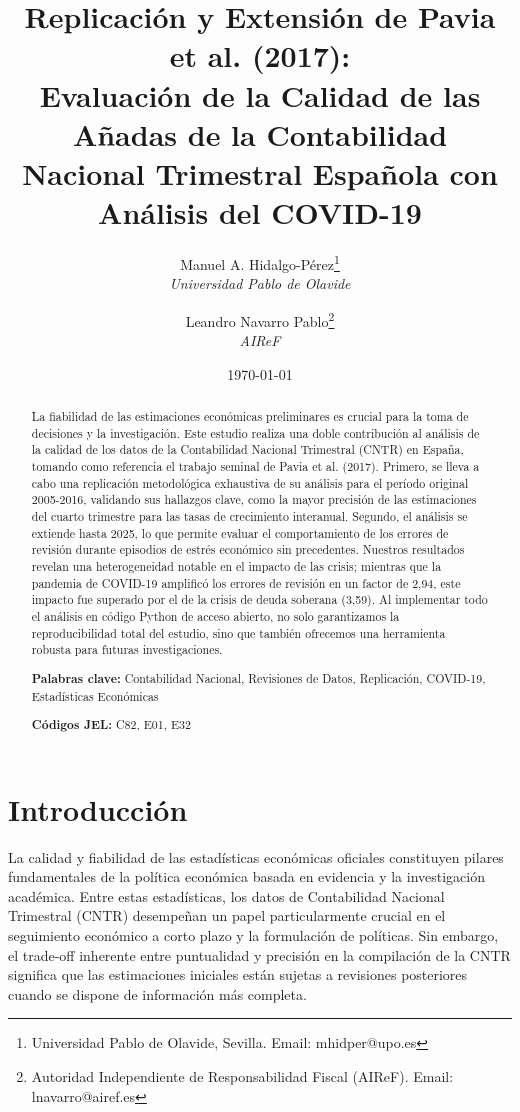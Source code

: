\documentclass[12pt,a4paper]{article}
\title{\textbf{Replicación y Extensión de Pavia et al. (2017): \\Evaluación de la Calidad de las Añadas de la Contabilidad Nacional Trimestral Española con Análisis del COVID-19}}
\author{
    Manuel A. Hidalgo-Pérez\thanks{Universidad Pablo de Olavide, Sevilla. Email: mhidper@upo.es} \\ 
    \textit{Universidad Pablo de Olavide} \\[0.5em]
    \and
    Leandro Navarro Pablo\thanks{Autoridad Independiente de Responsabilidad Fiscal (AIReF). Email: lnavarro@airef.es} \\
    \textit{AIReF}
}
\date{\today}
\begin{document}
\maketitle

\begin{abstract}
\noindent La fiabilidad de las estimaciones económicas preliminares es crucial para la toma de decisiones y la investigación. Este estudio realiza una doble contribución al análisis de la calidad de los datos de la Contabilidad Nacional Trimestral (CNTR) en España, tomando como referencia el trabajo seminal de Pavia et al. (2017). Primero, se lleva a cabo una replicación metodológica exhaustiva de su análisis para el período original 2005-2016, validando sus hallazgos clave, como la mayor precisión de las estimaciones del cuarto trimestre para las tasas de crecimiento interanual. Segundo, el análisis se extiende hasta 2025, lo que permite evaluar el comportamiento de los errores de revisión durante episodios de estrés económico sin precedentes. Nuestros resultados revelan una heterogeneidad notable en el impacto de las crisis; mientras que la pandemia de COVID-19 amplificó los errores de revisión en un factor de 2,94, este impacto fue superado por el de la crisis de deuda soberana (3,59). Al implementar todo el análisis en código Python de acceso abierto, no solo garantizamos la reproducibilidad total del estudio, sino que también ofrecemos una herramienta robusta para futuras investigaciones.

\noindent \textbf{Palabras clave:} Contabilidad Nacional, Revisiones de Datos, Replicación, COVID-19, Estadísticas Económicas

\noindent \textbf{Códigos JEL:} C82, E01, E32
\end{abstract}

\newpage

\section{Introducción}

La calidad y fiabilidad de las estadísticas económicas oficiales constituyen pilares fundamentales de la política económica basada en evidencia y la investigación académica. Entre estas estadísticas, los datos de Contabilidad Nacional Trimestral (CNTR) desempeñan un papel particularmente crucial en el seguimiento económico a corto plazo y la formulación de políticas. Sin embargo, el trade-off inherente entre puntualidad y precisión en la compilación de la CNTR significa que las estimaciones iniciales están sujetas a revisiones posteriores cuando se dispone de información más completa.
\end{document}
